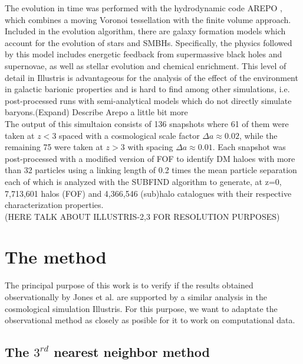 \documentclass[a4paper,fleqn,usenatbib]{mnras}
\begin{document}
The evolution in time was performed with the hydrodynamic code AREPO
\cite{arepo}, which combines a moving Voronoi tessellation with the
finite volume approach. Included in the evolution algorithm, there are
galaxy formation models which account for the evolution of stars and
SMBHs. Specifically, the physics followed by this model includes
energetic feedback from supermassive black holes and supernovae, as
well as stellar evolution and chemical enrichment. This level of
detail in Illustris is advantageous for the analysis of the effect of
the environment  in galactic barionic properties and is hard to find
among other simulations, i.e. post-processed runs with semi-analytical
models which do not directly simulate baryons.(Expand) Describe Arepo
a little bit more\\ 

The output of this simultaion consists of 136 snapshots where 61 of
them were taken at $z < 3$ spaced with a cosmological scale factor
$\Delta a \approx 0.02$, while the remaining 75 were taken at $z > 3$
with spacing $\Delta a \approx 0.01$. Each snapshot was post-processed
with a modified version of FOF \cite{FOF} to identify DM haloes with
more than 32 particles using a linking length of 0.2 times the mean
particle separation each of which is analyzed with the SUBFIND
algorithm \cite{subfind} to generate, at z=0, 7,713,601 halos (FOF)
and 4,366,546 (sub)halo catalogues with their respective
characterization properties. \\ 

(HERE TALK ABOUT ILLUSTRIS-2,3 FOR RESOLUTION PURPOSES)

\section{The method}

The principal purpose of this work is to verify if the results
obtained observationally by Jones et al. \cite{jones1} are supported
by a similar analysis in the cosmological simulation Illustris. For
this purpose, we want to adaptate the observational method as closely
as posible for it to work on computational data.\\ 

\subsection{The $3^{rd}$ nearest neighbor method}
\end{document}
